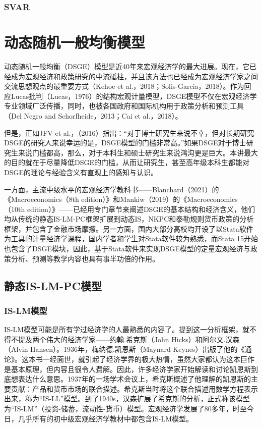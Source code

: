 \documentclass[cn,12pt,math=newtx,citestyle=gb7714-2015,bibstyle=gb7714-2015]{elegantbook}
\begin{document}
	
	\subsection{SVAR}
	
	
	
	
	\chapter{动态随机一般均衡模型}
	
	动态随机一般均衡（DSGE）模型是近40年来宏观经济学的最大进展。现在，它已经成为宏观经济和政策研究的中流砥柱，并且该方法也已经成为宏观经济学家之间交流思想观点的最重要方式（Kehoe et al.，2018；Solis-Garcia，2018）。作为回应Lucas批判（Lucas，1976）的结构宏观计量模型，DSGE模型不仅在宏观经济学专业领域广泛传播，同时，也被各国政府和国际机构用于政策分析和预测工具（Del Negro and Schorfheide，2013；Cai et al.，2018）。
	
	但是，正如JFV et al.，（2016）指出：“对于博士研究生来说不幸，但对长期研究DSGE的研究人来说幸运的是，DSGE模型的门槛非常高。”如果DSGE对于博士研究生来说门槛都高，那么，对于本科生和硕士研究生来说鸿沟更是巨大。本讲最大的目的就在于尽量降低DSGE的门槛，从而让研究生，甚至高年级本科生都能对DSGE的理论与经验含义有直观上的感知与认识。
	
	一方面，主流中级水平的宏观经济学教科书——Blanchard（2021）的《Macroeconomics（8th edition）》和Mankiw（2019）的《Macroeconomics（10th edition）》——已经用专门章节来阐述DSGE的基本结构和经济含义，他们均从传统的静态IS-LM-PC框架扩展到动态IS，NKPC和泰勒规则货币政策的分析框架，并包含了金融市场摩擦。另一方面，国内大部分高校均开设了以Stata软件为工具的计量经济学课程，国内学者和学生对Stata软件较为熟悉，而Stata 15开始也包含了DSGE模块，因此，基于Stata软件来实现DSGE模型的定量宏观经济与政策分析、预测等教学内容也具有事半功倍的作用。
	
	\section{静态IS-LM-PC模型}
	\subsection{IS-LM模型}
	IS-LM模型可能是所有学过经济学的人最熟悉的内容了。提到这一分析框架，就不得不提及两个伟大的经济学家——约翰.希克斯（John Hicks）和阿尔文.汉森（Alvin Hansen）。1936年，梅纳德.凯恩斯（Maynard Keynes）出版了他的《通论》。这本书一经面世，就引起了经济学界的极大热情，虽然大家都认为这本巨作是基本原理，但内容且很令人费解。因此，许多经济学家开始解读和讨论凯恩斯到底想表达什么意思。1937年的一场学术会议上，希克斯概述了他理解的凯恩斯的主要贡献：产品和货币市场的联合描述。希克斯当时将这个联合描述用数学方程表示出来，称为“IS-LL”模型。到了1940s，汉森扩展了希克斯的分析，正式称该模型为“IS-LM”（投资-储蓄，流动性-货币）模型。宏观经济学发展了80多年，时至今日，几乎所有的初中级宏观经济学教材中都包含IS-LM模型。
	
\end{document}
